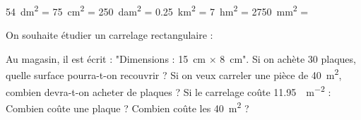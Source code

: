 \documentclass[../Cours.tex]{subfiles}
\begin{document}
\begin{questions}
    \exercice 
        \question \qty{54}{dm\squared} = 
        \question \qty{75}{cm\squared} = 
        \question \qty{250}{dam\squared} = 
        \question \qty{0,25}{km\squared} = 
        \question \qty{7}{hm\squared} = 
        \question \qty{2750}{mm\squared} = 

    \clearpage
    \exercice On souhaite étudier un carrelage rectangulaire :
    \begin{center}
    \end{center}

    Au magasin, il est écrit : "Dimensions : \qty{15}{\centi\metre} $\times$ \qty{8}{\centi\metre}".
    \question Si on achète 30 plaques, quelle surface pourra-t-on recouvrir ?
    \question Si on veux carreler une pièce de \qty{40}{\metre\squared}, combien devra-t-on acheter de plaques ?
    \question Si le carrelage coûte \qty{11.95}{\EURO\per\metre\squared} :
        \subquestion Combien coûte une plaque ?
        \subquestion Combien coûte les \qty{40}{\metre\squared} ?
\end{questions}
\end{document}
